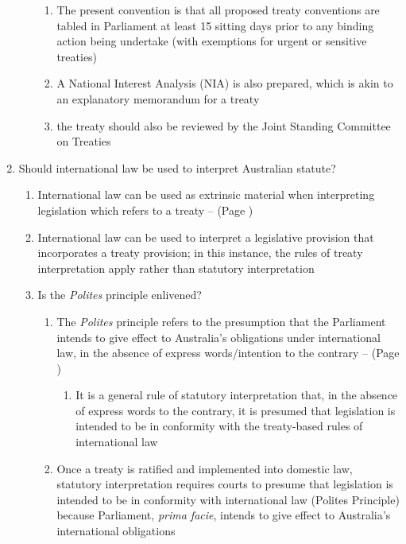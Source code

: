\begin{enumerate}
\begin{enumerate}
\begin{enumerate}
            \item The present convention is that all proposed treaty conventions are tabled in Parliament at least 15 sitting days prior to any binding action being undertake (with exemptions for urgent or sensitive treaties)
            \item A National Interest Analysis (NIA) is also prepared, which is akin to an explanatory memorandum for a treaty
            \item the treaty should also be reviewed by the Joint Standing Committee on Treaties
        \end{enumerate}
    \end{enumerate}
    \item Should international law be used to interpret Australian statute?
    \begin{enumerate}
        \item International law can be used as extrinsic material when interpreting legislation which refers to a treaty --  (Page \pageref{Acts Interpretation Act s 15AB})
        \item International law can be used to interpret a legislative provision that incorporates a treaty provision; in this instance, the rules of treaty interpretation apply rather than statutory interpretation
        \item Is the \textit{Polites} principle enlivened?
        \begin{enumerate}
            \item The \textit{Polites} principle refers to the presumption that the Parliament intends to give effect to Australia's obligations under international law, in the absence of express words/intention to the contrary --  (Page \pageref{case:Polites v Commonwealth})
            \begin{enumerate}
                \item It is a general rule of statutory interpretation that, in the absence of express words to the contrary, it is presumed that legislation is intended to be in conformity with the treaty-based rules of international law
            \end{enumerate}
            \item Once a treaty is ratified and implemented into domestic law, statutory interpretation requires courts to presume that legislation is intended to be in conformity with international law (Polites Principle) because Parliament, \textit{prima facie}, intends to give effect to Australia's international obligations

\end{enumerate}
\end{enumerate}
\end{enumerate}
